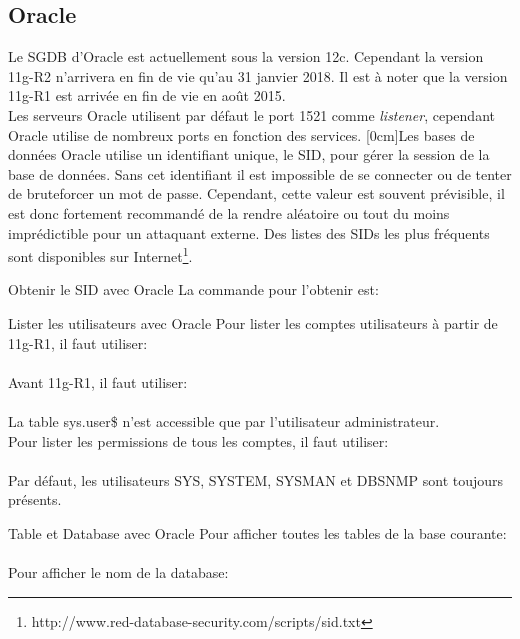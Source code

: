 \documentclass[twoside,a4paper,12pt,titlepage]{book}
\newcommand{\MarginPar}[2]{\marginnote{\scriptsize #1}[#2]}
\begin{document}
\subsection{Oracle}
	Le \gls{SGDB} d'Oracle est actuellement sous la version 12c. Cependant la version 11g-R2 n'arrivera en fin de vie qu'au 31 janvier 2018. Il est à noter que la version 11g-R1 est arrivée en fin de vie en août 2015.\\
	Les serveurs Oracle utilisent par défaut le port 1521 comme \textit{listener}, cependant Oracle utilise de nombreux ports en fonction des services.
	\MarginPar{\textbf{SID}}{0cm}Les bases de données Oracle utilise un identifiant unique, le SID, pour gérer la session de la base de données. Sans cet identifiant il est impossible de se connecter ou de tenter de bruteforcer un mot de passe. Cependant, cette valeur est souvent prévisible, il est donc fortement recommandé de la rendre aléatoire ou tout du moins imprédictible pour un attaquant externe. Des listes des SIDs les plus fréquents sont disponibles sur Internet\footnote{http://www.red-database-security.com/scripts/sid.txt}.\\
\begin{FlagConsole}{Obtenir le SID avec Oracle}
La commande pour l'obtenir est:\\
\end{FlagConsole}
\begin{FlagConsole}{Lister les utilisateurs avec Oracle}
	Pour lister les comptes utilisateurs à partir de 11g-R1, il faut utiliser:\\
	\\
	Avant 11g-R1, il faut utiliser:\\
	\\
	La table sys.user\$ n'est accessible que par l'utilisateur administrateur.\\
	Pour lister les permissions de tous les comptes, il faut utiliser: \\
	\\
	Par défaut, les utilisateurs SYS, SYSTEM, SYSMAN et DBSNMP sont toujours présents.
\end{FlagConsole}
\begin{FlagConsole}{Table et Database avec Oracle}
	Pour afficher toutes les tables de la base courante:\\
	\\
	Pour afficher le nom de la database:\\
\end{FlagConsole}
\end{document}

